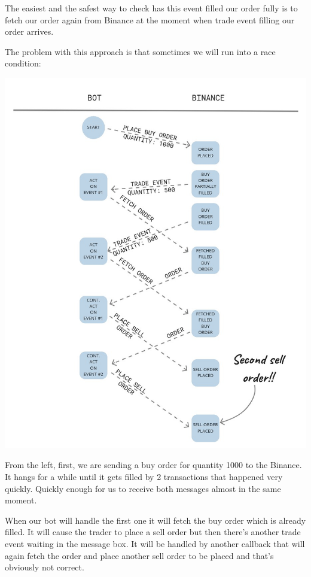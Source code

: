\documentclass[
  oneside]{book}
\begin{document}
The easiest and the safest way to check has this event filled our order fully is to fetch our order again from Binance at the moment when trade event filling our order arrives.

The problem with this approach is that sometimes we will run into a race condition:

\begin{center}\includegraphics[width=1\linewidth,height=0.55\textheight]{images/chapter_08_03_race_condition_timeline} \end{center}

From the left, first, we are sending a buy order for quantity 1000 to the Binance. It hangs for a while until it gets filled by 2 transactions that happened very quickly. Quickly enough for us to receive both messages almost in the same moment.

When our bot will handle the first one it will fetch the buy order which is already filled. It will cause the trader to place a sell order but then there's another trade event waiting in the message box. It will be handled by another callback that will again fetch the order and place another sell order to be placed and that's obviously not correct.
\end{document}
